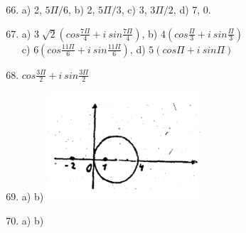 \documentclass[11pt]{amsbook}
\begin{document}
\begin{enumerate}
	\setcounter{enumi}{65}

	\item a) 2, $5\Pi/6$, b) 2, $5\Pi/3$, c) 3, $3\Pi/2$, d) 7, 0.

	\setcounter{enumi}{67}

	\item a) $3\sqrt[]{2}(cos\frac{7\Pi}{4}+i\ sin\frac{7\Pi}{4})$, b) $4(cos\frac{\Pi}{3}+i\ sin\frac{\Pi}{3})$\\
	c) $6(cos\frac{11\Pi}{6}+i\ sin\frac{11\Pi}{6})$, d) $5(cos\Pi+i\ sin\Pi)$

	\setcounter{enumi}{69}

	\item $cos \frac{3\Pi}{2}+i\ sin\frac{3\Pi}{2}$

	\setcounter{enumi}{71}

	\item a) b) \raisebox{-.5\height}		{\includegraphics[width=0.45\textwidth]{images/b1p2-335-fig02}}

	\setcounter{enumi}{73}

	\item a)  b) 

\end{enumerate}












\end{document}
